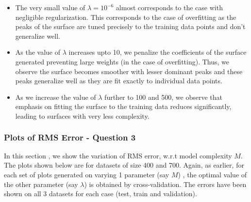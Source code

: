 \documentclass{article}
\begin{document}
\begin{itemize}
\item The very small value of $\lambda=10^{-6}$ almost corresponds to the case with negligible regularization. This corresponds to the case of overfitting as the peaks of the surface are tuned precisely to the training data points and don't generalize well.
\item As the value of $\lambda$ increases upto 10, we penalize the coefficients of the surface generated preventing large weights (in the case of overfitting). Thus, we observe the surface becomes smoother with lesser dominant peaks and these peaks generalize well as they are fit exactly to individual data points.
\item As we increase the value of $\lambda$ further to 100 and 500, we observe that emphasis on fitting the surface to the training data reduces significantly, leading to surfaces with very less complexity.
\end{itemize}


\subsubsection{Plots of RMS Error - Question 3}

In this section , we show the variation of RMS error, w.r.t model complexity $M$. The plots shown below are for datasets of size 400 and 700.
Again, as earlier, for each set of plots generated on varying 1 parameter (say $M$) , the optimal value of the other parameter (say $\lambda$) is obtained by cross-validation. 
The errors have been shown on all 3 datasets for each case (test, train and validation). 
\end{document}
